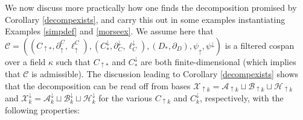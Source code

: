 \documentclass[11pt]{amsart}
\theoremstyle{definition}
\theoremstyle{remark}
\numberwithin{equation}{section}
\begin{document}
We now discuss more practically how one finds the decomposition promised by Corollary \ref{decompexists}, and carry this out in some examples instantiating Examples \ref{simpdef} and \ref{morseex}.  We assume here that $\mathcal{C}=\left((C_{\uparrow *},\partial_{\uparrow}^C,\ell_{\uparrow}^C),(C^{\downarrow}_{*},\partial^{\downarrow}_C,\ell^{\downarrow}_C),(D_*,\partial_D),\psi_{\uparrow},\psi^{\downarrow}\right)$ is a filtered cospan over a field $\kappa$ such that $C_{\uparrow *}$ and $C^{\downarrow}_{*}$ are both finite-dimensional (which implies that $\mathcal{C}$ is admissible).  The discussion leading to Corollary \ref{decompexists} shows that the decomposition can be read off from bases $\mathcal{X}_{\uparrow k}=\mathcal{A}_{\uparrow k}\sqcup \mathcal{B}_{\uparrow k}\sqcup \mathcal{H}_{\uparrow k}$ and $\mathcal{X}^{\downarrow}_{k} =\mathcal{A}^{\downarrow}_{k}\sqcup \mathcal{B}^{\downarrow}_{k}\sqcup \mathcal{H}^{\downarrow}_{k}$ for the various $C_{\uparrow k}$ and $C^{\downarrow}_{k}$, respectively, with the following properties:
\end{document}
